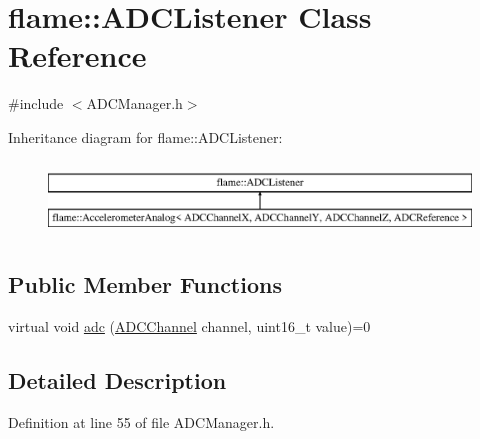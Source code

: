 \hypertarget{classflame_1_1_a_d_c_listener}{\section{flame\-:\-:A\-D\-C\-Listener Class Reference}
\label{classflame_1_1_a_d_c_listener}
}


{\ttfamily \#include $<$A\-D\-C\-Manager.\-h$>$}

Inheritance diagram for flame\-:\-:A\-D\-C\-Listener\-:\begin{figure}[H]
\begin{center}
\leavevmode
\includegraphics[height=1.982301cm]{classflame_1_1_a_d_c_listener}
\end{center}
\end{figure}
\subsection*{Public Member Functions}
\begin{DoxyCompactItemize}
\item 
virtual void \hyperlink{classflame_1_1_a_d_c_listener_a87fbe7d5aa43969f0a60c653c9e45796}{adc} (\hyperlink{atmega1280_8h_ab5a361d214bf33f4d9d443d9db44043d}{A\-D\-C\-Channel} channel, uint16\-\_\-t value)=0
\end{DoxyCompactItemize}


\subsection{Detailed Description}


Definition at line 55 of file A\-D\-C\-Manager.\-h.



